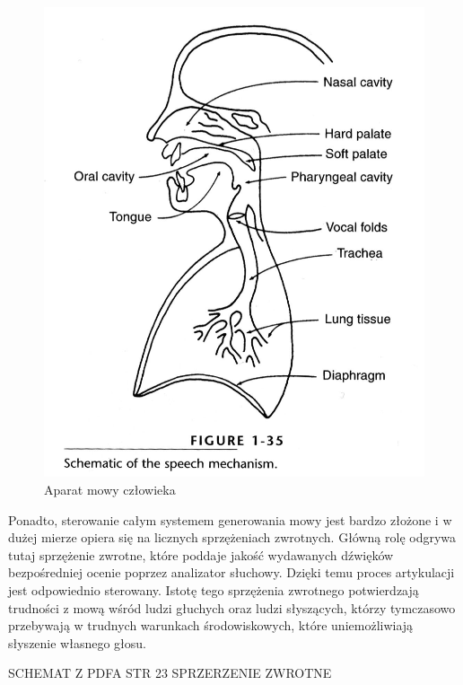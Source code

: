 \documentclass[eng,printmode]{mgr}
\begin{document}
\begin{figure}
	\includegraphics[scale=0.45]{speechmech.png}
	\caption{Aparat mowy człowieka}
\end{figure}

 Ponadto, sterowanie całym systemem generowania mowy jest bardzo złożone i w dużej mierze opiera się na licznych sprzężeniach zwrotnych. Główną rolę odgrywa tutaj sprzężenie zwrotne, które poddaje jakość wydawanych dźwięków bezpośredniej ocenie poprzez analizator słuchowy. Dzięki temu proces artykulacji jest odpowiednio sterowany. Istotę tego sprzężenia zwrotnego potwierdzają trudności z mową wśród ludzi głuchych oraz ludzi słyszących, którzy tymczasowo przebywają w trudnych warunkach środowiskowych, które uniemożliwiają słyszenie własnego głosu.
 
 SCHEMAT Z PDFA STR 23 SPRZERZENIE ZWROTNE  
  
\end{document}
